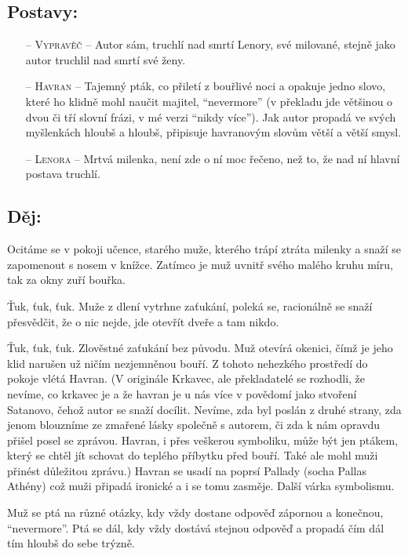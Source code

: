\documentclass[A4paper]{extarticle} %
\begin{document}
\subsection*{Postavy:} 
\noindent
\begin{itemize}
    \item [--] \textsc{Vypravěč} -- Autor sám, truchlí nad smrtí Lenory, své milované, stejně jako autor truchlil nad smrtí své ženy. 
    \item [--] \textsc{Havran} -- Tajemný pták, co přiletí z bouřlivé noci a opakuje jedno slovo, které ho klidně mohl naučit majitel, \enquote{nevermore} (v překladu jde většinou o dvou či tří slovní frázi, v mé verzi \enquote{nikdy více}). Jak autor propadá ve svých myšlenkách hloubš a hloubš, připisuje havranovým slovům větší a větší smysl.
    \item [--] \textsc{Lenora} -- Mrtvá milenka, není zde o ní moc řečeno, než to, že nad ní hlavní postava truchlí.
\end{itemize}

\subsection*{Děj:}
{\setlength{\parindent}{0pt}\setlength{\parskip}{0.5em}
Ocitáme se v pokoji učence, starého muže, kterého trápí ztráta milenky a snaží se zapomenout s nosem v knížce. Zatímco je muž uvnitř svého malého kruhu míru, tak za okny zuří bouřka.

Ťuk, ťuk, ťuk. Muže z dlení vytrhne zaťukání, poleká se, racionálně se snaží přesvědčit, že o nic nejde, jde otevřít dveře a tam nikdo.

Ťuk, ťuk, ťuk. Zlověstné zaťukání bez původu. Muž otevírá okenici, čímž je jeho klid narušen už ničím nezjemněnou bouří. Z tohoto nehezkého prostředí do pokoje vlétá Havran. (V originále Krkavec, ale překladatelé se rozhodli, že nevíme, co krkavec je a že havran je u nás více v povědomí jako stvoření Satanovo, čehož autor se snaží docílit. Nevíme, zda byl poslán z druhé strany, zda jenom blouzníme ze zmařené lásky společně s autorem, či zda k nám opravdu přišel posel se zprávou. Havran, i přes veškerou symboliku, může být jen ptákem, který se chtěl jít schovat do teplého příbytku před bouří. Také ale mohl muži přinést důležitou zprávu.) Havran se usadí na poprsí Pallady (socha Pallas Athény) což muži připadá ironické a i se tomu zasměje. Další várka symbolismu.

Muž se ptá na různé otázky, kdy vždy dostane odpověď zápornou a konečnou, \enquote{nevermore}. Ptá se dál, kdy vždy dostává stejnou odpověď a propadá čím dál tím hloubš do sebe trýzně.
}
\end{document}
